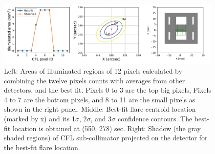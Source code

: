 \documentclass[referee]{aa} %
\begin{document}
\begin{figure}
  \centering
  \includegraphics[width=0.95\linewidth]{figures/cflMay07.pdf}
  \caption{
   Left: Areas of illuminated regions of 12 pixels calculated by combining
  the twelve pixels counts with averages from other detectors, and the best fit. 
  Pixels 0 to 3 are the top big pixels, Pixels 4 to 7 are the bottom pixels, and 8 to 11 are the small pixels as shown in the right panel.
   Middle: Best-fit flare centroid location (marked by x) and its 1$\sigma$, 2$\sigma$, and 3$\sigma$ confidence contours.
   The best-fit location is obtained at (550, 278) sec. 
    Right:  Shadow (the gray shaded regions) of CFL sub-collimator projected on the detector 
  for the best-fit flare location. }
  \label{fig:cfl}
\end{figure}
\end{document}
